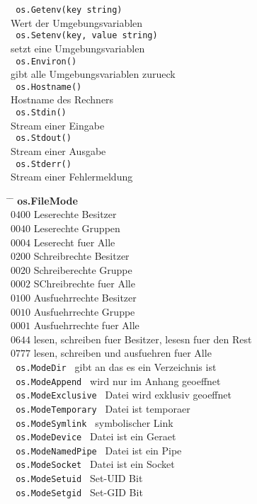 \documentclass[twoside,a4paper,12pt]{article}
\begin{document}
\begin{tabbing}
 \> \verb| os.Getenv(key string) | \\ 
 \> Wert der Umgebungsvariablen \\ 
 \> \verb| os.Setenv(key, value string) | \\ 
 \> setzt eine Umgebungsvariablen \\ 
 \> \verb| os.Environ() | \\ 
 \> gibt alle Umgebungsvariablen zurueck \\ 
 \> \verb| os.Hostname() | \\ 
 \> Hostname des Rechners \\ 
 \> \verb| os.Stdin() | \\ 
 \> Stream einer Eingabe \\ 
 \> \verb| os.Stdout() | \\ 
 \> Stream einer Ausgabe \\ 
 \> \verb| os.Stderr() | \\ 
 \> Stream einer Fehlermeldung \\ 
\end{tabbing}
\newpage
\begin{tabbing}
 \hspace{2mm} \= \hspace{50mm} \= \kill
 \> \textbf{os.FileMode} \\
 \> $0400$ \> Leserechte Besitzer \\ 
 \> $0040$ \> Leserechte Gruppen \\
 \> $0004$ \> Leserecht fuer Alle \\
 \> $0200$ \> Schreibrechte Besitzer \\ 
 \> $0020$ \> Schreiberechte Gruppe \\
 \> $0002$ \> SChreibrechte fuer Alle \\ 
 \> $0100$ \> Ausfuehrrechte Besitzer \\ 
 \> $0010$ \> Ausfuehrrechte Gruppe \\ 
 \> $0001$ \> Ausfuehrrechte fuer Alle \\
 \> $0644$ \> lesen, schreiben fuer Besitzer, lesesn fuer den Rest \\ 
 \> $0777$ \> lesen, schreiben und ausfuehren fuer Alle \\
 \> \verb| os.ModeDir | \> gibt an das es ein Verzeichnis ist \\ 
 \> \verb| os.ModeAppend | \> wird nur im Anhang geoeffnet \\ 
 \> \verb| os.ModeExclusive | \> Datei wird exklusiv geoeffnet \\ 
 \> \verb| os.ModeTemporary | \> Datei ist temporaer \\ 
 \> \verb| os.ModeSymlink | \> symbolischer Link \\ 
 \> \verb| os.ModeDevice | \> Datei ist ein Geraet \\ 
 \> \verb| os.ModeNamedPipe | \> Datei ist ein Pipe \\ 
 \> \verb| os.ModeSocket | \> Datei ist ein Socket \\ 
 \> \verb| os.ModeSetuid | \> Set-UID Bit \\ 
 \> \verb| os.ModeSetgid | \> Set-GID Bit \\ 
 \end{tabbing}
\end{document}
